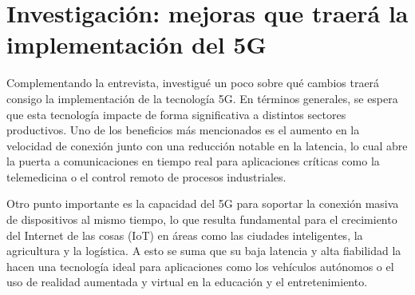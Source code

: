 \documentclass[12pt,a4paper]{article}
\begin{document}
\section*{Investigación: mejoras que traerá la implementación del 5G}
Complementando la entrevista, investigué un poco sobre qué cambios traerá consigo la implementación de la tecnología 5G. En términos generales, se espera que esta tecnología impacte de forma significativa a distintos sectores productivos. Uno de los beneficios más mencionados es el aumento en la velocidad de conexión junto con una reducción notable en la latencia, lo cual abre la puerta a comunicaciones en tiempo real para aplicaciones críticas como la telemedicina o el control remoto de procesos industriales.

Otro punto importante es la capacidad del 5G para soportar la conexión masiva de dispositivos al mismo tiempo, lo que resulta fundamental para el crecimiento del Internet de las cosas (IoT) en áreas como las ciudades inteligentes, la agricultura y la logística. A esto se suma que su baja latencia y alta fiabilidad la hacen una tecnología ideal para aplicaciones como los vehículos autónomos o el uso de realidad aumentada y virtual en la educación y el entretenimiento.
\end{document}
